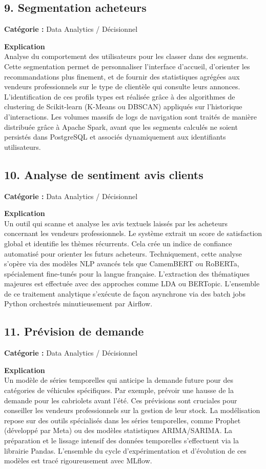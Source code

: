 \documentclass[11pt,a4paper]{article}
\begin{document}
\subsection{9. Segmentation acheteurs}
\textbf{Catégorie :} Data Analytics / Décisionnel

\textbf{Explication}\\
Analyse du comportement des utilisateurs pour les classer dans des segments. Cette segmentation permet de personnaliser l'interface d'accueil, d'orienter les recommandations plus finement, et de fournir des statistiques agrégées aux vendeurs professionnels sur le type de clientèle qui consulte leurs annonces. L'identification de ces profils types est réalisée grâce à des algorithmes de clustering de Scikit-learn (K-Means ou DBSCAN) appliqués sur l'historique d'interactions. Les volumes massifs de logs de navigation sont traités de manière distribuée grâce à Apache Spark, avant que les segments calculés ne soient persistés dans PostgreSQL et associés dynamiquement aux identifiants utilisateurs.

\subsection{10. Analyse de sentiment avis clients}
\textbf{Catégorie :} Data Analytics / Décisionnel

\textbf{Explication}\\
Un outil qui scanne et analyse les avis textuels laissés par les acheteurs concernant les vendeurs professionnels. Le système extrait un score de satisfaction global et identifie les thèmes récurrents. Cela crée un indice de confiance automatisé pour orienter les futurs acheteurs. Techniquement, cette analyse s'opère via des modèles NLP avancés tels que CamemBERT ou RoBERTa, spécialement fine-tunés pour la langue française. L'extraction des thématiques majeures est effectuée avec des approches comme LDA ou BERTopic. L'ensemble de ce traitement analytique s'exécute de façon asynchrone via des batch jobs Python orchestrés minutieusement par Airflow.

\subsection{11. Prévision de demande}
\textbf{Catégorie :} Data Analytics / Décisionnel

\textbf{Explication}\\
Un modèle de séries temporelles qui anticipe la demande future pour des catégories de véhicules spécifiques. Par exemple, prévoir une hausse de la demande pour les cabriolets avant l'été. Ces prévisions sont cruciales pour conseiller les vendeurs professionnels sur la gestion de leur stock. La modélisation repose sur des outils spécialisés dans les séries temporelles, comme Prophet (développé par Meta) ou des modèles statistiques ARIMA/SARIMA. La préparation et le lissage intensif des données temporelles s'effectuent via la librairie Pandas. L'ensemble du cycle d'expérimentation et d'évolution de ces modèles est tracé rigoureusement avec MLflow.
\end{document}
